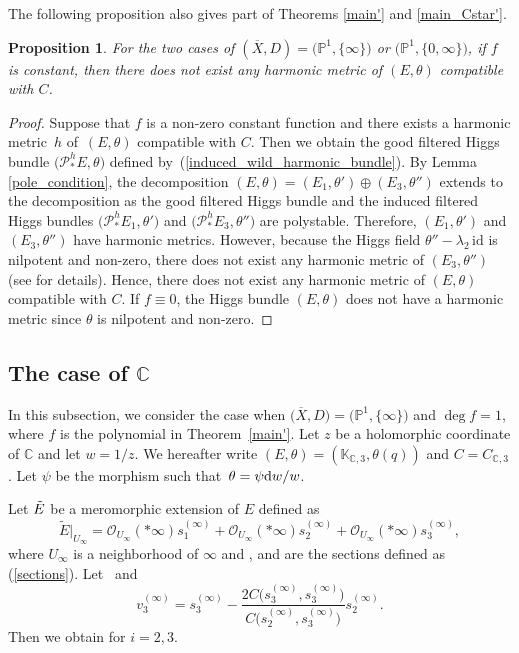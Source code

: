 \documentclass[pdftex]{sigma}
\numberwithin{equation}{section}
\newtheorem{Proposition}[Theorem]{Proposition}
 { \theoremstyle{definition}
\newtheorem{Definition}[Theorem]{Definition}
\newtheorem{Note}[Theorem]{Note}
\newtheorem{Example}[Theorem]{Example}
\newtheorem{Remark}[Theorem]{Remark}

\newtheorem{Question}[Theorem]{Question}
\newtheorem{Assumption}[Theorem]{Assumption}}
\newcommand{\C}{\mathbb{C}}
\newcommand{\ps}{\mathbb{P}}
\newcommand{\id}{\mathrm{id}}
\begin{document}
The following proposition also gives part of Theorems \ref{main'} and \ref{main_Cstar'}.
\begin{Proposition}\label{remark_degree}
 For the two cases of $(\overline{X},D)=\bigl(\ps^1,\{\infty\}\bigr)$ or $\bigl(\ps^1,\{0,\infty\}\bigr)$, if $f$ is constant, then there does not exist any harmonic metric of $(E,\theta)$ compatible with $C$.
\end{Proposition}
\begin{proof}
 Suppose that $f$ is a non-zero constant function and there exists a harmonic metric~$h$ of~$(E,\theta)$ compatible with $C$. Then we obtain the good filtered Higgs bundle $\bigl(\mathcal{P}^h_{*} E,\theta\bigr)$ defined by~(\ref{induced_wild_harmonic_bundle}).
 By Lemma \ref{pole_condition}, the decomposition $(E,\theta) = (E_1,\theta')\oplus (E_3,\theta '')$ extends to the decomposition as the good filtered Higgs bundle and the induced filtered Higgs bundles $\bigl(\mathcal{P}^h_{*} E_1,\theta'\bigr)$ and $\bigl(\mathcal{P}^h_{*} E_3,\theta''\bigr)$ are polystable. Therefore, $(E_1,\theta')$ and $(E_3,\theta '')$ have harmonic metrics. However, because the Higgs field $\theta''-\lambda_2\,\id$ is nilpotent and non-zero, there does not exist any harmonic metric of $(E_3,\theta '')$ (see \cite[Propositions~3.41 and~3.42]{LM3} for details). Hence, there does not exist any harmonic metric of $(E,\theta)$ compatible with $C$.
 If $f\equiv 0$, the Higgs bundle $(E,\theta)$ does not have a harmonic metric since $\theta$ is nilpotent and non-zero.
\end{proof}

\subsection[The case of C]{The case of $\boldsymbol{\C}$}

In this subsection, we consider the case when $\bigl(\overline{X},D\bigr)=\bigl(\mathbb{P}^1,\{\infty\}\bigr)$ and $\deg{f}= 1$, where $f$ is the polynomial in Theorem~\ref{main'}.
Let $z$ be a holomorphic coordinate of $\C$ and let ${w=1/z}$. We hereafter write $(E,\theta) = (\mathbb{K}_{\C,3},\theta(q))$ and $C=C_{\C,3}$. Let $\psi$ be the morphism such that~${\theta = \psi {\rm d}w/w}$.

Let $\Tilde{E}$ be a meromorphic extension of $E$ defined as
\[
\tilde{E}|_{U_{\infty}} = \mathcal{O}_{U_{\infty}}(*\infty)s^{(\infty)}_1+\mathcal{O}_{U_{\infty}}(*\infty)s^{(\infty)}_2+\mathcal{O}_{U_{\infty}}(*\infty)s^{(\infty)}_3,
\]
where $U_{\infty}$ is a neighborhood of $\infty$ and ,  and  are the sections defined as (\ref{sections}).
Let~ and
\begin{equation*}
 v^{(\infty)}_3 = s^{(\infty)}_3-\frac{2C\bigl(s^{(\infty)}_3,s^{(\infty)}_3\bigr)}{C\bigl(s^{(\infty)}_2,s^{(\infty)}_3\bigr)}s^{(\infty)}_2.
\end{equation*}
Then we obtain  for $i=2,3$.
\end{document}
